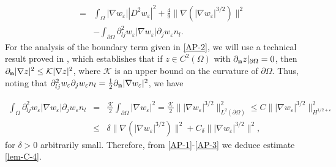 \documentclass[11pt,reqno]{amsart}%
\numberwithin{equation}{section}
\begin{document}
{\begin{eqnarray}
&=&\int_\Omega|\nabla w_\varepsilon||D^2w_\varepsilon|^2+\frac49\|\nabla(|\nabla w_\varepsilon|^{3/2})\|^2\nonumber\\
&&-\int_{\partial\Omega}\partial^2_{lj}w_\varepsilon|\nabla w_\varepsilon|\partial_jw_\varepsilon n_l.\label{AP-2}
\end{eqnarray} 
For the analysis of the boundary term given in \eqref{AP-2}, we will use a technical result proved in \cite[Lemma 4.10]{Mizoguchi}, which establishes that if $z\in C^2(\Omega)$ with $\partial_{\bf n}z|_{\partial\Omega}=0$, then $\partial_{\bf n}|\nabla z|^2\le \mathcal{K}|\nabla z|^2$, where $\mathcal{K}$ is an upper bound on the curvature of $\partial\Omega$. Thus, noting that $\partial^2_{lj}w_\varepsilon\partial_jw_\varepsilon n_l=\frac12\partial_{\bf n}|\nabla w_\varepsilon|^2$, we have

\begin{eqnarray}
\int_\Omega\partial^2_{lj}w_\varepsilon|\nabla w_\varepsilon|\partial_jw_\varepsilon n_l
&=&\frac{\mathcal{K}}{2}\int_{\partial\Omega}|\nabla w_\varepsilon|^2=\frac{\mathcal{K}}{2}\||\nabla w_\varepsilon|^{3/2}\|^2_{L^2(\partial\Omega)}
\le C\||\nabla w_\varepsilon|^{3/2}\|^2_{H^{1/2+\varepsilon}}\nonumber\\
&\le&\delta\|\nabla(|\nabla w_\varepsilon|^{3/2})\|^2+C_\delta\||\nabla w_\varepsilon|^{3/2}\|^2,\label{AP-3}
\end{eqnarray}
for $\delta>0$ arbitrarily small. Therefore, from \eqref{AP-1}-\eqref{AP-3} we deduce estimate \eqref{lem-C-4}.

}
\end{document}
